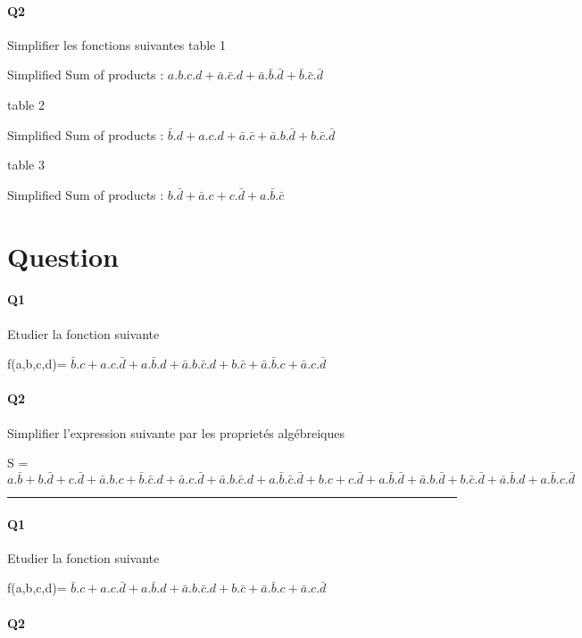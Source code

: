 \paragraph{Q2}

Simplifier les fonctions suivantes
table 1

Simplified Sum of products : $a.b.c.d+\bar a.\bar c.d+\bar a.\bar b.\bar d+\bar b.\bar c.\bar d$

table 2

Simplified Sum of products : $\bar b.d+a.c.d+\bar a.\bar c+\bar a.b.\bar d+b.\bar c.\bar d$

table 3

Simplified Sum of products : $b.\bar d+\bar a.c+c.\bar d+a.\bar b.\bar c$

\pagebreak
\section{Question}

\paragraph{Q1}

Etudier la fonction suivante

f(a,b,c,d)= $\bar b.c+a.c.\bar d+a.\bar b.d+\bar a.b.\bar c.d + b.\bar c+\bar a.\bar b.c+\bar a.c.\bar d$

\paragraph{Q2}

Simplifier l'expression suivante par les proprietés algébreiques 

S = $a.\bar b+b.\bar d+c.\bar d+\bar a.b.c+\bar b.\bar c.d + \bar a.c.\bar d+\bar a.b.\bar c.d+a.\bar b.\bar c.\bar d + b.c+c.\bar d+a.\bar b.\bar d+\bar a.b.\bar d + b.\bar c.\bar d+\bar a.\bar b.d+a.\bar b.c.\bar d$

\hrule width 1\linewidth
\paragraph{Q1}

Etudier la fonction suivante

f(a,b,c,d)= $\bar b.c+a.c.\bar d+a.\bar b.d+\bar a.b.\bar c.d + b.\bar c+\bar a.\bar b.c+\bar a.c.\bar d$

\paragraph{Q2}

